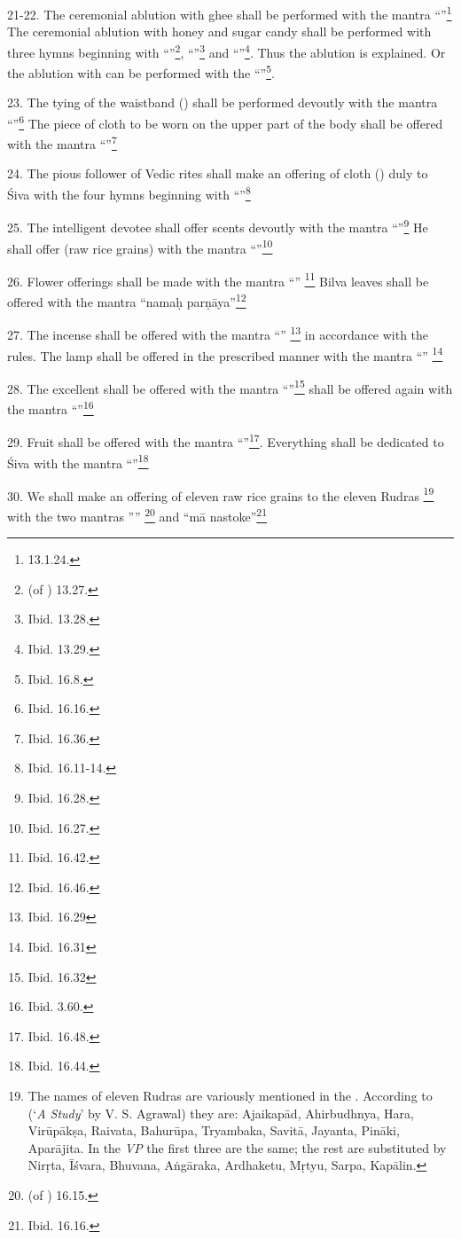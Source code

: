 21-22. The ceremonial ablution with ghee shall be performed with the mantra
“”\footnote{ 13.1.24.} \etc The ceremonial
ablution with honey and sugar candy shall be performed with three hymns
beginning with “”\footnote{
(of ) 13.27.}, “”\footnote{Ibid. 13.28.} and
“”\footnote{Ibid. 13.29.}. Thus the  ablution is
explained. Or the ablution with  can be performed with
the  “”\footnote{Ibid. 16.8.}.

23. The tying of the waistband () shall be performed devoutly
with the mantra “”\footnote{Ibid. 16.16.} \etc The piece of cloth
to be worn on the upper part of the body shall be offered with the mantra
“”\footnote{Ibid. 16.36.} \etc

24. The pious follower of Vedic rites shall make an offering of cloth
() duly to Śiva with the four hymns beginning with
“”\footnote{Ibid. 16.11-14.} \etc

25. The intelligent devotee shall offer scents devoutly with the mantra
“”\footnote{Ibid. 16.28.} \etc He shall offer 
(raw rice grains) with the mantra “”\footnote{Ibid. 16.27.} \etc

26. Flower offerings shall be made with the mantra “”
\footnote{Ibid. 16.42.} \etc Bilva leaves shall be offered with the mantra
“namaḥ parṇāya”\footnote{Ibid. 16.46.} \etc

27. The incense shall be offered with the mantra “”
\footnote{Ibid. 16.29} \etc in accordance with the rules. The lamp shall be
offered in the prescribed manner with the mantra “”
\footnote{Ibid. 16.31} \etc

28. The excellent  shall be offered with the mantra “”\footnote{Ibid. 16.32} \etc {} shall be offered again with
the mantra “”\footnote{Ibid. 3.60.} \etc

29. Fruit shall be offered with the mantra “”\footnote{Ibid.
16.48.}. Everything shall be dedicated to Śiva with the mantra “”\footnote{Ibid. 16.44.} \etc

30. We shall make an offering of eleven raw rice grains to the eleven Rudras
\footnote{The names of eleven Rudras are variously mentioned in the .
According to  (‘\emph{A Study}’ by V. S. Agrawal) they are:
Ajaikapād, Ahirbudhnya, Hara, Virūpākṣa, Raivata, Bahurūpa, Tryambaka, Savitā,
Jayanta, Pināki, Aparājita. In the \emph{VP} the first three are the same;
the rest are substituted by Nirṛta, Īśvara, Bhuvana, Aṅgāraka, Ardhaketu, Mṛtyu,
Sarpa, Kapālin.} with the two mantras ””
\footnote{ (of ) 16.15.} \etc and
“mā nastoke”\footnote{Ibid. 16.16.} \etc

